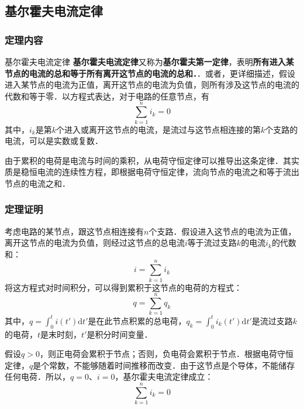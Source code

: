 
\subsection{基尔霍夫电流定律}

\subsubsection{定理内容}
\begin{theorem}{基尔霍夫电流定律}
\textbf{基尔霍夫电流定律}又称为\textbf{基尔霍夫第一定律}，表明\textbf{所有进入某节点的电流的总和等于所有离开这节点的电流的总和．}．或者，更详细描述，假设进入某节点的电流为正值，离开这节点的电流为负值，则所有涉及这节点的电流的代数和等于零．以方程式表达，对于电路的任意节点，有
\begin{equation}
\sum_{k=1}^n i_k =0
\end{equation}
其中，$i_k$是第$k$个进入或离开这节点的电流，是流过与这节点相连接的第$k$个支路的电流，可以是实数或复数．
\end{theorem}

由于累积的电荷是电流与时间的乘积，从电荷守恒定律可以推导出这条定律．其实质是稳恒电流的连续性方程，即根据电荷守恒定律，流向节点的电流之和等于流出节点的电流之和．

\subsubsection{定理证明}
考虑电路的某节点，跟这节点相连接有$n$个支路．假设进入这节点的电流为正值，离开这节点的电流为负值，则经过这节点的总电流$i$等于流过支路$k$的电流$i_k$的代数和：
\begin{equation}
i=\sum_{k=1}^n i_k
\end{equation}
将这方程式对时间积分，可以得到累积于这节点的电荷的方程式：
\begin{equation}
q=\sum_{k=1}^n q_k
\end{equation}
其中，$\displaystyle q=\int_0^t i(t') \mathrm{d}t'$是在此节点积累的总电荷，$\displaystyle q_k=\int_0^t i_k(t') \mathrm{d}t'$是流过支路$k$的电荷，$t$是末时刻，$t'$是积分时间变量．

假设$q>0$，则正电荷会累积于节点；否则，负电荷会累积于节点．根据电荷守恒定律，$q$是个常数，不能够随着时间推移而改变．由于这节点是个导体，不能储存任何电荷．所以，$q=0$、$i=0$，基尔霍夫电流定律成立：
\begin{equation}
\sum_{k=1}^n i_k =0
\end{equation}

